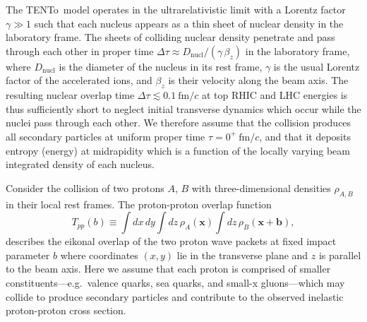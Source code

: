 \documentclass[aps,prc,reprint,amsmath,nofootinbib]{revtex4-1}
\newcommand{\trento}{T\raisebox{-0.5ex}{R}ENTo}
\newcommand{\fmc}{\ensuremath{\text{fm}/c}}
\newcommand{\x}{\mathbf x}
\begin{document}
The \trento\ model operates in the ultrarelativistic limit with a Lorentz factor $\gamma \gg 1$ such that each nucleus appears as a thin sheet of nuclear density in the laboratory frame.
The sheets of colliding nuclear density penetrate and pass through each other in proper time $\Delta \tau \approx D_\text{nucl} / (\gamma\, \beta_z)$ in the laboratory frame, where $D_\text{nucl}$ is the diameter of the nucleus in its rest frame, $\gamma$ is the usual Lorentz factor of the accelerated ions, and $\beta_z$ is their velocity along the beam axis.
The resulting nuclear overlap time $\Delta \tau \lesssim 0.1\ \fmc$ at top RHIC and LHC energies is thus sufficiently short to neglect initial transverse dynamics which occur while the nuclei pass through each other.
We therefore assume that the collision produces all secondary particles at uniform proper time $\tau = 0^+\ \fmc$, and that it deposits entropy (energy) at midrapidity which is a function of the locally varying beam integrated density of each nucleus.

Consider the collision of two protons $A$, $B$ with three-dimensional densities $\rho_{A,B}$ in their local rest frames.
The proton-proton overlap function
\begin{equation}
  \label{eq:tpp}
  T_{pp}(b) \equiv \int dx\, dy \int dz\, \rho_A(\x) \int dz\, \rho_B(\x + \mathbf{b}),
\end{equation}
describes the eikonal overlap of the two proton wave packets at fixed impact parameter $b$ where coordinates $(x, y)$ lie in the transverse plane and $z$ is parallel to the beam axis.
Here we assume that each proton is comprised of smaller constituents---e.g.\ valence quarks, sea quarks, and small-x gluons---which may collide to produce secondary particles and contribute to the observed inelastic proton-proton cross section.
\end{document}
